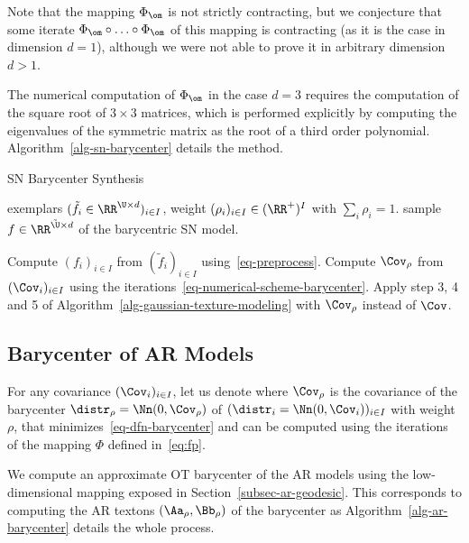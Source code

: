 Note that the mapping $\Phi_\om$ is not strictly contracting, but we conjecture that some iterate $\Phi_\om \circ \ldots \circ \Phi_\om$ of this mapping is contracting (as it is the case in dimension $d=1$), although we were not able to prove it in arbitrary dimension $d>1$. 

The numerical computation of $\Phi_\om$ in the case $d=3$ requires the computation of the square root of $3 \times 3$ matrices, which is performed explicitly by computing the eigenvalues of the symmetric matrix as the root of a third order polynomial. Algorithm~\ref{alg-sn-barycenter} details the method.

\begin{algorithm}[ht!]
\caption{SN Barycenter Synthesis}
\label{alg-sn-barycenter}
\begin{algorithmic}[1]
\Require exemplars $(\tilde f_i \in \RR^{\U \times d})_{i \in I}$, weight $(\rho_{i})_{i \in I} \in (\RR^+)^{I}$ with $\sum_i \rho_i=1$.
\Ensure sample $f \in \RR^{\tilde \U \times d}$ of the barycentric SN model.
\Statex
\begin{enumerate}
	 Compute $(f_i)_{i \in I}$ from $(\tilde f_i)_{i \in I}$ 
			using~\eqref{eq-preprocess}.
	 Compute $\Cov_\rho$ from $(\Cov_i)_{i \in I}$ using the iterations~\eqref{eq-numerical-scheme-barycenter}.
	 Apply step 3, 4 and 5 of Algorithm~\ref{alg-gaussian-texture-modeling}
		with $\Cov_\rho$ instead of $\Cov$. 
\end{enumerate}
\end{algorithmic}
\end{algorithm}


\subsection{Barycenter of AR Models}

For any covariance $(\Cov_i)_{i \in I}$, let us denote
where $\Cov_\rho$ is the covariance of the barycenter $\distr_\rho=\Nn(0,\Cov_\rho)$ of $(\distr_i=\Nn(0,\Cov_i))_{i \in I}$ with weight $\rho$, that minimizes~\eqref{eq-dfn-barycenter} and can be computed using the iterations of the mapping $\Phi$ defined in~\eqref{eq:fp}.

We compute an approximate OT barycenter of the AR models using the low-dimensional mapping exposed in Section~\ref{subsec-ar-geodesic}. This corresponds to computing the AR textons $(\Aa_\rho,\Bb_\rho)$ of the barycenter as
Algorithm~\ref{alg-ar-barycenter} details the whole process. 

